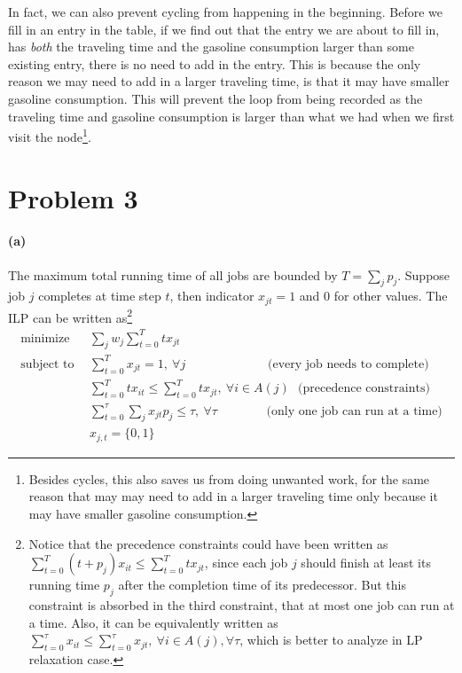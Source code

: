 \documentclass[12pt]{article}
\begin{document}
In fact, we can also prevent cycling from happening in the beginning. Before we fill in an entry in the table, if we find out that the entry we are about to fill in, has \emph{both} the traveling time and the gasoline consumption larger than some existing entry, there is no need to add in the entry. This is because the only reason we may need to add in a larger traveling time, is that it may have smaller gasoline consumption. This will prevent the loop from being recorded as the traveling time and gasoline consumption is larger than what we had when we first visit the node\footnote{Besides cycles, this also saves us from doing unwanted work, for the same reason that may may need to add in a larger traveling time only because it may have smaller gasoline consumption.}.

\newpage
\section*{Problem 3}
\paragraph{(a)} The maximum total running time of all jobs are bounded by $T = \sum_j p_j$. Suppose job $j$ completes at time step $t$, then indicator $x_{jt} = 1$ and $0$ for other values. The ILP can be written as\footnote{Notice that the precedence constraints could have been written as $\sum_{t=0}^T (t+p_j) x_{it} \leq \sum_{t=0}^T t x_{jt}$, since each job $j$ should finish at least its running time $p_j$ after the completion time of its predecessor. But this constraint is absorbed in the third constraint, that at most one job can run at a time. Also, it can be equivalently written as $\sum_{t=0}^\tau x_{it} \leq \sum_{t=0}^\tau x_{jt}, \: \forall i \in A(j), \forall \tau$, which is better to analyze in LP relaxation case.}
\begin{align*}
\text{minimize}\:\:& \sum_j{w_j}\sum_{t=0}^{T} t x_{jt}\\
\text{subject to}\:\:& \sum_{t=0}^T x_{jt} = 1,\: \forall j \:\:\:\:\:\:\:\:\:\:\:\:\:\:\:\:\:\:\:\:\:\:\:\:\:\:\:\:\:\: \text{(every job needs to complete)}\\
&\sum_{t=0}^T t x_{it} \leq \sum_{t=0}^T t x_{jt}, \: \forall i \in A(j) \:\:\: \text{(precedence constraints)}\\
& \sum_{t=0}^{\tau} \sum_{j} x_{jt}p_{j} \leq \tau, \: \forall \tau \:\:\:\:\:\:\:\:\:\:\:\:\:\:\:\:\:\: \text{(only one job can run at a time)}\\
& x_{j,t} = \{0, 1\}
\end{align*}
\end{document}
